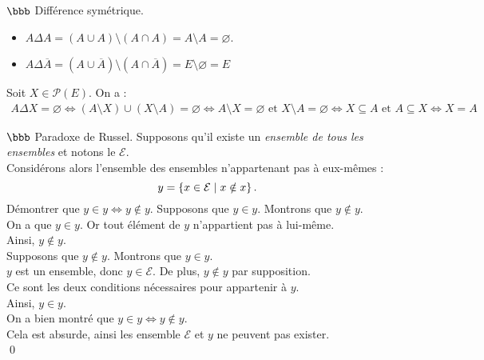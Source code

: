 \documentclass[11pt]{article}
\begin{document}
\begin{exercice}{$\bbb$ Différence symétrique.}{}
\begin{itemize}
        \item $A \Delta A = (A \cup A) \setminus (A \cap A) = A \setminus A = \varnothing$.
        \item $A \Delta \overline{A} = (A \cup \overline{A}) \setminus (A \cap \overline{A}) = E \setminus \varnothing = E$
    \end{itemize}
     Soit $X \in \mathcal{P}(E)$. On a :
    \begin{align*}
        A \Delta X = \varnothing
        \iff (A \setminus X) \cup (X \setminus A) = \varnothing
        \iff A \setminus X = \varnothing \text{ et } X \setminus A = \varnothing
        \iff X \subseteq A \text{ et } A \subseteq X
        \iff X = A
    \end{align*}
\end{exercice}

\begin{exercice}{$\bbb$ Paradoxe de Russel.}{}
    Supposons qu'il existe un \emph{ensemble de tous les ensembles} et notons le $\mathcal{E}$.\\
    Considérons alors l'ensemble des ensembles n'appartenant pas à eux-mêmes :
    \begin{equation*}
        y=\left\lbrace x \in \mathcal{E} \hspace{0.1cm} | \hspace{0.1cm} x \notin x \right\rbrace.
    \end{equation*}
    Démontrer que $y \in y \iff y \notin y$.
    \tcblower
    Supposons que $y \in y$. Montrons que $y \notin y$.\\
    On a que $y \in y$.
    Or tout élément de $y$ n'appartient pas à lui-même.\\
    Ainsi, $y \notin y$.\\[0.25cm]
    Supposons que $y \notin y$. Montrons que $y \in y$.\\
    $y$ est un ensemble, donc $y \in \mathcal{E}$. De plus, $y \notin y$ par supposition.\\
    Ce sont les deux conditions nécessaires pour appartenir à $y$.\\
    Ainsi, $y \in y$.\\[0.25cm]
    On a bien montré que $y \in y \iff y \notin y$.\\
    Cela est absurde, ainsi les ensemble $\mathcal{E}$ et $y$ ne peuvent pas exister.\\
    \qed
\end{exercice}
\end{document}
